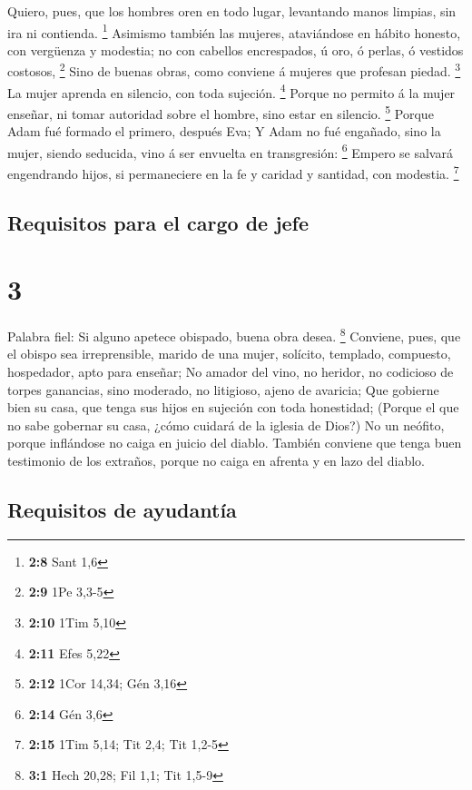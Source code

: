  Quiero, pues, que los hombres oren en todo lugar,
levantando manos limpias, sin ira ni contienda. \footnote{\textbf{2:8}
  Sant 1,6}  Asimismo también las mujeres, ataviándose en
hábito honesto, con vergüenza y modestia; no con cabellos encrespados, ú
oro, ó perlas, ó vestidos costosos, \footnote{\textbf{2:9} 1Pe 3,3-5}
 Sino de buenas obras, como conviene á mujeres que profesan
piedad. \footnote{\textbf{2:10} 1Tim 5,10}  La mujer
aprenda en silencio, con toda sujeción. \footnote{\textbf{2:11} Efes
  5,22}  Porque no permito á la mujer enseñar, ni tomar
autoridad sobre el hombre, sino estar en silencio. \footnote{\textbf{2:12}
  1Cor 14,34; Gén 3,16}  Porque Adam fué formado el
primero, después Eva;  Y Adam no fué engañado, sino la
mujer, siendo seducida, vino á ser envuelta en transgresión: \footnote{\textbf{2:14}
  Gén 3,6}  Empero se salvará engendrando hijos, si
permaneciere en la fe y caridad y santidad, con modestia. \footnote{\textbf{2:15}
  1Tim 5,14; Tit 2,4; Tit 1,2-5}

\hypertarget{requisitos-para-el-cargo-de-jefe}{%
\subsection{Requisitos para el cargo de
jefe}\label{requisitos-para-el-cargo-de-jefe}}

\hypertarget{section-2}{%
\section{3}\label{section-2}}

 Palabra fiel: Si alguno apetece obispado, buena obra desea.
\footnote{\textbf{3:1} Hech 20,28; Fil 1,1; Tit 1,5-9} 
Conviene, pues, que el obispo sea irreprensible, marido de una mujer,
solícito, templado, compuesto, hospedador, apto para enseñar;
 No amador del vino, no heridor, no codicioso de torpes
ganancias, sino moderado, no litigioso, ajeno de avaricia; 
Que gobierne bien su casa, que tenga sus hijos en sujeción con toda
honestidad;  (Porque el que no sabe gobernar su casa, ¿cómo
cuidará de la iglesia de Dios?)  No un neófito, porque
inflándose no caiga en juicio del diablo.  También conviene
que tenga buen testimonio de los extraños, porque no caiga en afrenta y
en lazo del diablo.

\hypertarget{requisitos-de-ayudantuxeda}{%
\subsection{Requisitos de ayudantía}\label{requisitos-de-ayudantuxeda}}

